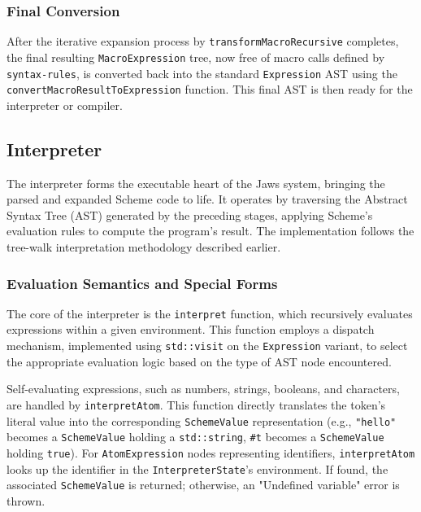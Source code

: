 \documentclass[final]{cmpreport_02}
\begin{document}
\subsubsection{Final Conversion}
After the iterative expansion process by \texttt{transformMacroRecursive} completes, the final resulting \texttt{MacroExpression} tree, now free of macro calls defined by \texttt{syntax-rules}, is converted back into the standard \texttt{Expression} AST using the \texttt{convertMacroResultToExpression} function. This final AST is then ready for the interpreter or compiler.

\subsection{Interpreter}

The interpreter forms the executable heart of the Jaws system, bringing the parsed and expanded Scheme code to life. It operates by traversing the Abstract Syntax Tree (AST) generated by the preceding stages, applying Scheme's evaluation rules to compute the program's result. The implementation follows the tree-walk interpretation methodology described earlier.

\subsubsection{Evaluation Semantics and Special Forms}

The core of the interpreter is the \texttt{interpret} function, which recursively evaluates expressions within a given environment. This function employs a dispatch mechanism, implemented using \texttt{std::visit} on the \texttt{Expression} variant, to select the appropriate evaluation logic based on the type of AST node encountered.

Self-evaluating expressions, such as numbers, strings, booleans, and characters, are handled by \texttt{interpretAtom}. This function directly translates the token's literal value into the corresponding \texttt{SchemeValue} representation (e.g., \texttt{"hello"} becomes a \texttt{SchemeValue} holding a \texttt{std::string}, \texttt{\#t} becomes a \texttt{SchemeValue} holding \texttt{true}). For \texttt{AtomExpression} nodes representing identifiers, \texttt{interpretAtom} looks up the identifier in the \texttt{InterpreterState}'s environment. If found, the associated \texttt{SchemeValue} is returned; otherwise, an "Undefined variable" error is thrown.
\end{document}
